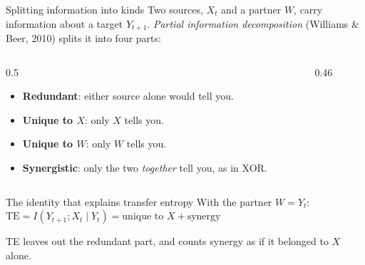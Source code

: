 \documentclass[aspectratio=169,11pt,xcolor={table}]{beamer}
\newcommand{\Xt}{X_t}
\newcommand{\Yt}{Y_t}
\newcommand{\Yn}{Y_{t+1}}
\begin{document}
\begin{frame}{Splitting information into kinds}
  Two sources, $\Xt$ and a partner $W$, carry information about a target $\Yn$.
  \emph{Partial information decomposition} (Williams \& Beer, 2010) splits it into four parts:
  \medskip
  \begin{columns}[c]
    \begin{column}{0.5\textwidth}
      \begin{itemize}
        \item \textbf{Redundant}: either source alone would tell you.
        \item \textbf{Unique to $X$}: only $X$ tells you.
        \item \textbf{Unique to $W$}: only $W$ tells you.
        \item \textbf{Synergistic}: only the two \emph{together} tell you, as in XOR.
      \end{itemize}
    \end{column}
    \begin{column}{0.46\textwidth}
      \centering
    \end{column}
  \end{columns}
  \bigskip
  \begin{block}{The identity that explains transfer entropy}
    With the partner $W = \Yt$:\qquad
    $\mathrm{TE} = I(\Yn;\Xt \mid \Yt) = \text{unique to } X + \text{synergy}$
    \smallskip

    TE leaves out the redundant part, and counts synergy as if it belonged to $X$ alone.
  \end{block}
\end{frame}
\end{document}
